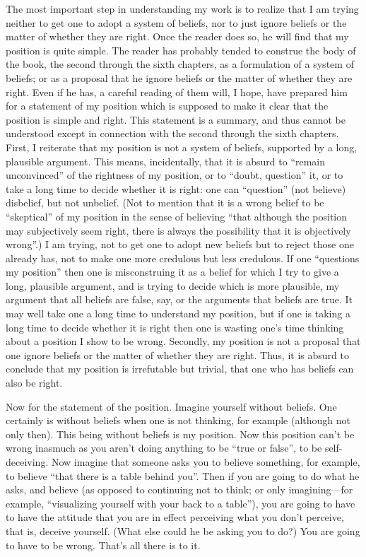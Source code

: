 The most important step in understanding my work is to realize that I 
am trying neither to get one to adopt a system of beliefs, nor to just ignore 
beliefs or the matter of whether they are right. Once the reader does so, he 
will find that my position is quite simple. The reader has probably tended to 
construe the body of the book, the second through the sixth chapters, as a 
formulation of a system of beliefs; or as a proposal that he ignore beliefs or 
the matter of whether they are right. Even if he has, a careful reading of 
them will, I hope, have prepared him for a statement of my position which is 
supposed to make it clear that the position is simple and right. This 
statement is a summary, and thus cannot be understood except in 
connection with the second through the sixth chapters. First, I reiterate that 
my position is not a system of beliefs, supported by a long, plausible 
argument. This means, incidentally, that it is absurd to \enquote{remain 
unconvinced} of the rightness of my position, or to \enquote{doubt, question} it, or 
to take a long time to decide whether it is right: one can \enquote{question} (not 
believe) disbelief, but not unbelief. (Not to mention that it is a wrong belief 
to be \enquote{skeptical} of my position in the sense of believing \enquote{that although the 
position may subjectively seem right, there is always the possibility that it is 
objectively wrong}.) I am trying, not to get one to adopt new beliefs but to 
reject those one already has, not to make one more credulous but less 
credulous. If one \enquote{questions my position} then one is misconstruing it as a 
belief for which I try to give a long, plausible argument, and is trying to 
decide which is more plausible, my argument that all beliefs are false, say, or 
the arguments that beliefs are true. It may well take one a long time to 
understand my position, but if one is taking a long time to decide whether it 
is right then one is wasting one's time thinking about a position I show to be 
wrong. Secondly, my position is not a proposal that one ignore beliefs or the 
matter of whether they are right. Thus, it is absurd to conclude that my 
position is irrefutable but trivial, that one who has beliefs can also be right. 

Now for the statement of the position. Imagine yourself without 
beliefs. One certainly is without beliefs when one is not thinking, for 
example (although not only then). This being without beliefs is my position. 
Now this position can't be wrong inasmuch as you aren't doing anything to 
be \enquote{true or false}, to be self-deceiving. Now imagine that someone asks you 
to believe something, for example, to believe \enquote{that there is a table behind 
you}. Then if you are going to do what he asks, and believe (as opposed to 
continuing not to think; or only imagining---for example, \enquote{visualizing 
yourself with your back to a table}), you are going to have to have the 
attitude that you are in effect perceiving what you don't perceive, that is, 
deceive yourself. (What else could he be asking you to do?) You are going 
to have to be wrong. That's all there is to it. 

